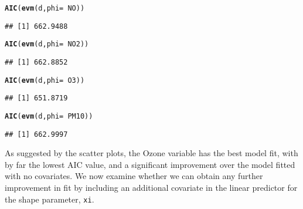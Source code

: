 \documentclass[10pt]{article}\usepackage[]{graphicx}\usepackage[]{color}
\makeatletter
\newcommand{\hlopt}[1]{\textcolor[rgb]{0,0,0}{#1}}%
\newcommand{\hlstd}[1]{\textcolor[rgb]{0.345,0.345,0.345}{#1}}%
\newcommand{\hlkwc}[1]{\textcolor[rgb]{0.333,0.667,0.333}{#1}}%
\newcommand{\hlkwd}[1]{\textcolor[rgb]{0.737,0.353,0.396}{\textbf{#1}}}%
\newenvironment{kframe}{%
 \def\at@end@of@kframe{}%
 \ifinner\ifhmode%
  \def\at@end@of@kframe{\end{minipage}}%
  \begin{minipage}{\columnwidth}%
 \fi\fi%
 \def\FrameCommand##1{\hskip\@totalleftmargin \hskip-\fboxsep
 \colorbox{shadecolor}{##1}\hskip-\fboxsep
     \hskip-\linewidth \hskip-\@totalleftmargin \hskip\columnwidth}%
 \MakeFramed {\advance\hsize-\width
   \@totalleftmargin\z@ \linewidth\hsize
   \@setminipage}}%
 {\par\unskip\endMakeFramed%
 \at@end@of@kframe}
\newenvironment{knitrout}{}{} %
\makeatother
\begin{document}
\begin{knitrout}
\color{fgcolor}\begin{kframe}
\begin{alltt}
\hlkwd{AIC}\hlstd{(}\hlkwd{evm}\hlstd{(d,}\hlkwc{phi}\hlstd{=}\hlopt{~}\hlstd{NO))}
\end{alltt}
\begin{verbatim}
## [1] 662.9488
\end{verbatim}
\begin{alltt}
\hlkwd{AIC}\hlstd{(}\hlkwd{evm}\hlstd{(d,}\hlkwc{phi}\hlstd{=}\hlopt{~}\hlstd{NO2))}
\end{alltt}
\begin{verbatim}
## [1] 662.8852
\end{verbatim}
\begin{alltt}
\hlkwd{AIC}\hlstd{(}\hlkwd{evm}\hlstd{(d,}\hlkwc{phi}\hlstd{=}\hlopt{~}\hlstd{O3))}
\end{alltt}
\begin{verbatim}
## [1] 651.8719
\end{verbatim}
\begin{alltt}
\hlkwd{AIC}\hlstd{(}\hlkwd{evm}\hlstd{(d,}\hlkwc{phi}\hlstd{=}\hlopt{~}\hlstd{PM10))}
\end{alltt}
\begin{verbatim}
## [1] 662.9997
\end{verbatim}
\end{kframe}
\end{knitrout}

As suggested by the scatter plots, the Ozone variable has the best model fit, with by far the lowest AIC value, and a significant improvement over the model fitted with no covariates.  We now examine whether we can obtain any further improvement in fit by including an additional covariate in the linear predictor for the shape parameter, {\tt xi}.
\end{document}
